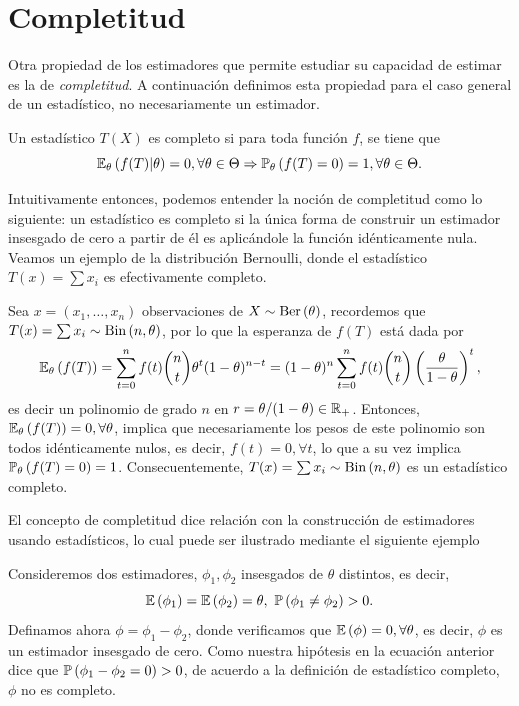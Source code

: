 \section{Completitud}

Otra propiedad de los estimadores que permite estudiar su capacidad de estimar es la de \textit{completitud}. A continuación definimos esta propiedad para el caso general de un estadístico, no necesariamente un estimador.

\begin{definition}
	Un estadístico $T(X)$ es completo si para toda función $f$, se tiene que 
	\begin{equation}
		\mathbb{E}_\theta \left(f(T)|\theta\right) = 0, \forall \theta\in\Theta \Rightarrow \mathbb{P}_\theta \left(f(T)=0\right) = 1, \forall \theta\in\Theta.
	\end{equation}
	
\end{definition}

Intuitivamente entonces, podemos entender la noción de completitud como lo siguiente: un estadístico es completo si la única forma de construir un estimador insesgado de cero a partir de él es aplicándole la función idénticamente nula.  Veamos un ejemplo de la distribución Bernoulli, donde el estadístico $T(x) = \sum x_i$ es efectivamente completo. 

\begin{example}
	\label{eq:est_completo_bernoulli}
	Sea $x=(x_1,\ldots,x_n)$ observaciones de $X\sim\text{Ber}\left(\theta\right)$, recordemos que $T(x) = \sum x_i\sim\text{Bin}\left(n,\theta\right)$, por lo que la esperanza de $f(T)$ está dada por
	\begin{equation}
		\mathbb{E}_\theta \left(f(T)\right) = \sum_{t=0}^n f(t)\binom{n}{t}\theta^t(1-\theta)^{n-t}= (1-\theta)^n\sum_{t=0}^n f(t)\binom{n}{t}\left(\frac{\theta}{1-\theta}\right)^t,
	\end{equation}
	es decir un polinomio de grado $n$ en $r=\theta/(1-\theta)\in{\mathbb R}_+$. Entonces, $\mathbb{E}_\theta \left(f(T)\right) = 0,\forall\theta$, implica que necesariamente los pesos de este polinomio son todos idénticamente nulos, es decir, $f(t)=0,\forall t$, lo que a su vez implica $\mathbb{P}_\theta \left(f(T)=0\right) = 1$. Consecuentemente, $T(x) = \sum x_i\sim\text{Bin}\left(n,\theta\right)$ es un estadístico completo.
\end{example}

El concepto de completitud dice relación con la construcción de estimadores usando estadísticos, lo cual puede ser ilustrado mediante el siguiente ejemplo

\begin{example}
	Consideremos dos estimadores, $\phi_1, \phi_2$ insesgados de $\theta$ distintos, es decir, 
	\begin{equation}
	\mathbb{E} \left(\phi_1\right) = \mathbb{E} \left(\phi_2\right) = \theta, \ \mathbb{P} \left(\phi_1\neq \phi_2\right) > 0.
	\end{equation}
	Definamos ahora $\phi = \phi_1 - \phi_2$, donde verificamos que $\mathbb{E} \left(\phi\right) = 0, \forall \theta$, es decir, $\phi$ es un estimador insesgado de cero. Como nuestra hipótesis en la ecuación anterior dice que $\mathbb{P} \left(\phi_1 - \phi_2=0\right)>0$, de acuerdo a la definición  de estadístico completo, $\phi$ no es completo. 
\end{example}


